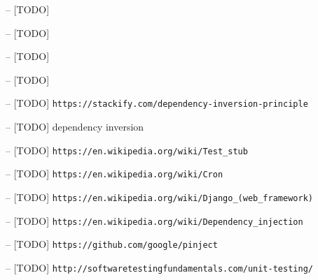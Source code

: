 \begin{thebibliography}{99999}
\singlespace\normalsize

 -- [TODO]

 -- [TODO]

 -- [TODO]

 -- [TODO]

 -- [TODO] \verb|https://stackify.com/dependency-inversion-principle|

 -- [TODO] dependency inversion

 -- [TODO] \verb|https://en.wikipedia.org/wiki/Test_stub|

 -- [TODO] \verb|https://en.wikipedia.org/wiki/Cron|

 -- [TODO] \verb|https://en.wikipedia.org/wiki/Django_(web_framework)|

 -- [TODO] \verb|https://en.wikipedia.org/wiki/Dependency_injection|

 -- [TODO] \verb|https://github.com/google/pinject|

 -- [TODO] \verb|http://softwaretestingfundamentals.com/unit-testing/|

\end{thebibliography}
